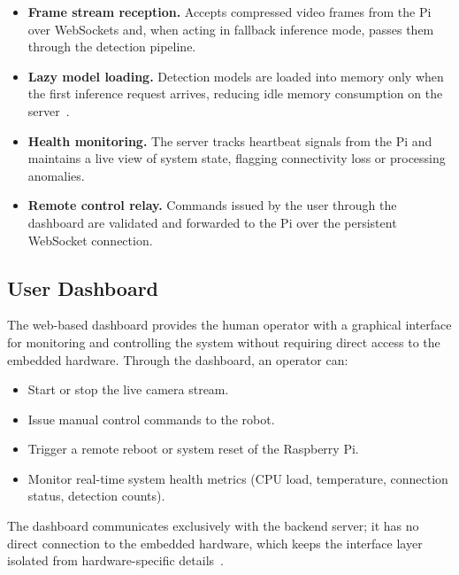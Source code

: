\begin{itemize}
    \item \textbf{Frame stream reception.} Accepts compressed video
          frames from the Pi over WebSockets and, when acting in
          fallback inference mode, passes them through the detection
          pipeline.
 
    \item \textbf{Lazy model loading.} Detection models are loaded
          into memory only when the first inference request arrives,
          reducing idle memory consumption on the
          server~\cite{gamma1994design}.
 
    \item \textbf{Health monitoring.} The server tracks heartbeat
          signals from the Pi and maintains a live view of system
          state, flagging connectivity loss or processing anomalies.
 
    \item \textbf{Remote control relay.} Commands issued by the user
          through the dashboard are validated and forwarded to the Pi
          over the persistent WebSocket connection.
\end{itemize}
 
\subsection{User Dashboard}
 
The web-based dashboard provides the human operator with a graphical
interface for monitoring and controlling the system without requiring
direct access to the embedded hardware. Through the dashboard, an
operator can:
 
\begin{itemize}
    \item Start or stop the live camera stream.
    \item Issue manual control commands to the robot.
    \item Trigger a remote reboot or system reset of the Raspberry Pi.
    \item Monitor real-time system health metrics (CPU load,
          temperature, connection status, detection counts).
\end{itemize}
 
The dashboard communicates exclusively with the backend server;
it has no direct connection to the embedded hardware, which keeps
the interface layer isolated from hardware-specific
details~\cite{gamma1994design}.
 
